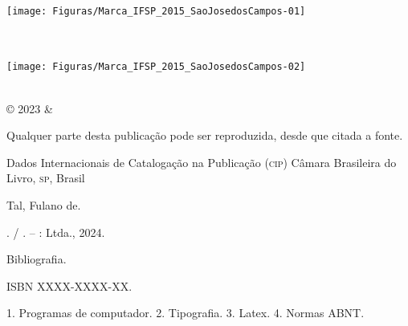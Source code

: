 \documentclass[
	12pt,				        %
	openright,			    %
	twoside,			      %
	a4paper,			      %
	chapter=TITLE,		  %
	section=TITLE,		  %
	subsection=TITLE,	  %
	subsubsection=TITLE,%
	english,			      %
	french,				      %
	brazil,				      %
	sumario=tradicional
]{abntex2}
\begin{document}
\frenchspacing

\frontmatter

\begin{titlingpage}
\phantom{xxx}
\vspace{0.5cm}
\huge
\raggedright
\imprimirautor\\
\vspace{2.5cm}
\huge 
{\raggedleft
\texttt{[image: Figuras/Marca\_IFSP\_2015\_SaoJosedosCampos-01]}\\[1cm]
\textit{\textcolor{blue}{\imprimirtitulo}}\\[1cm]
}
\centering 
\vfill
\Large
\imprimirinstituicao
\end{titlingpage}

\begin{titlingpage}

\phantom{xxx}
\vspace{0.5cm}
\huge
\raggedright
\imprimirautor\\
\vspace{2.5cm}
\huge 
{\raggedleft
\texttt{[image: Figuras/Marca\_IFSP\_2015\_SaoJosedosCampos-02]}\\[1cm]
\textit{\textcolor{blue}{\imprimirtitulo}}\\[1cm]
}
\centering 
\vfill
\Large
\imprimirinstituicao

\clearpage
\ABNTEXfontereduzida
© 2023 \imprimirautor \space \& \imprimirinstituicao

Qualquer parte desta publicação pode ser reproduzida, desde que citada a fonte.

\vspace*{\fill}

\begin{center}
Dados Internacionais de Catalogação na Publicação (\textsc{cip})
Câmara Brasileira do Livro, \textsc{sp}, Brasil
\end{center}

\begin{mdframed}
\noindent Tal, Fulano de.

\imprimirtitulo. / \imprimirautor. -- \imprimirlocal: \imprimirinstituicao
Ltda., \num{2024}.

\medskip

Bibliografia.

ISBN XXXX-XXXX-XX.

\medskip

1. Programas de computador. 2. Tipografia. 3. Latex. 4. Normas ABNT.

\end{mdframed}

\end{titlingpage}
\end{document}
